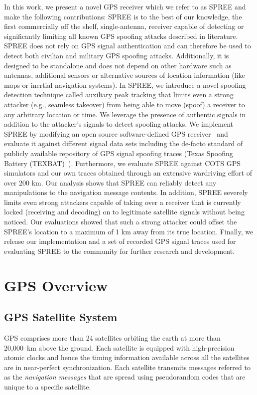 \documentclass[letterpaper,twocolumn,10pt]{article}
\newcommand{\eg}{e.g.,\xspace}
\newcommand{\rxname}{SPREE\xspace}
\begin{document}
In this work, we present a novel GPS receiver which we refer to as \rxname and make the following contributions: \rxname is to the best of our knowledge, the first commercially off the shelf, single-antenna, receiver capable of detecting or significantly limiting all known GPS spoofing attacks described in literature. \rxname does not rely on GPS signal authentication and can therefore be used to detect both civilian and military GPS spoofing attacks. Additionally, it is designed to be standalone and does not depend on other hardware such as antennas, additional sensors or alternative sources of location information (like maps or inertial navigation systems). In \rxname, we introduce a novel spoofing detection technique called auxiliary peak tracking that limits even a strong attacker (\eg seamless takeover) from being able to move (spoof) a receiver to any arbitrary location or time. We leverage the presence of authentic signals in addition to the attacker's signals to detect spoofing attacks. We implement \rxname by modifying an open source software-defined GPS receiver~\cite{GNSS-SDR11} and evaluate it against different signal data sets including the de-facto standard of publicly available repository of GPS signal spoofing traces (Texas Spoofing Battery (TEXBAT)~\cite{humphreys2012texas}). Furthermore, we evaluate \rxname against COTS GPS simulators and our own traces obtained through an extensive wardriving effort of over 200 km. Our analysis shows that \rxname can reliably detect any manipulations to the navigation message contents. In addition, \rxname severely limits even strong attackers capable of taking over a receiver that is currently locked (receiving and decoding) on to legitimate satellite signals without being noticed. Our evaluations showed that such a strong attacker could offset the \rxname's location to a maximum of 1 km away from its true location. Finally, we release our implementation and a set of recorded GPS signal traces used for evaluating \rxname to the community for further research and development.

\section{GPS Overview}
\label{sec:gps-overview}

\subsection{GPS Satellite System}

GPS comprises more than 24 satellites orbiting the earth at more than 20,000~km above the ground. Each satellite is equipped with high-precision atomic clocks and hence the timing information available across all the satellites are in
near-perfect synchronization. Each satellite transmits messages referred to as the \textit{navigation messages} that are spread using pseudorandom codes that are unique to a specific satellite. 
\end{document}
